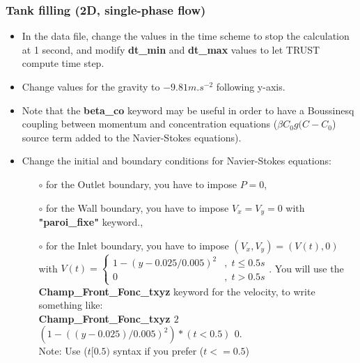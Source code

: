 \documentclass[10pt, hyperref={unicode=true,pdfusetitle, bookmarks=true,bookmarksnumbered=false,bookmarksopen=false, breaklinks=false,pdfborder={0 0 1},backref=true,colorlinks=true,linkcolor=darkblue,pageanchor}]{beamer}
\begin{document}
\begin{frame}
\frametitle{Tank filling (2D, single-phase flow)}
\begin{block}{}

\begin{itemize}
\item In the data file, change the values in the time scheme to stop the calculation at 1
second, and modify \textbf{dt\_min} and \textbf{dt\_max} values to let TRUST compute time step.

\item Change values for the gravity to $-9.81 m.s^{-2}$ following y-axis.

\item Note that the \textbf{beta\_co} keyword may be useful in order to have a Boussinesq coupling between momentum and concentration equations ($\beta C_0 g(C-C_0$) source term added to the Navier-Stokes equations).

\item Change the initial and boundary conditions for Navier-Stokes equations:
    \begin{itemize}
    \item [$\circ$] for the Outlet boundary, you have to impose $P=0$,
    \item [$\circ$] for the Wall boundary, you have to impose $V_x=V_y=0$ with \textbf{"paroi\_fixe"} keyword.,
    \item [$\circ$] for the Inlet boundary, you have to impose $(V_{x},V_{y})=(V(t),0)$ with 
    $V(t)=  
    \begin{cases}  
    1-(y-0.025/0.005)^{2} & ,\; t\leq0.5s\\
    0 & ,\; t>0.5s
    \end{cases}
    $. You will use the \textbf{Champ\_Front\_Fonc\_txyz} keyword for the velocity, to write something like: \\
    \textbf{Champ\_Front\_Fonc\_txyz $2$ $(1-((y-0.025)/0.005)^2)*(t<0.5)$ $0.$}\\
    Note: Use ($t[0.5)$ syntax if you prefer ($t<=0.5$)
    \end{itemize}
\end{itemize}

\end{block}
\end{frame}
\end{document}
